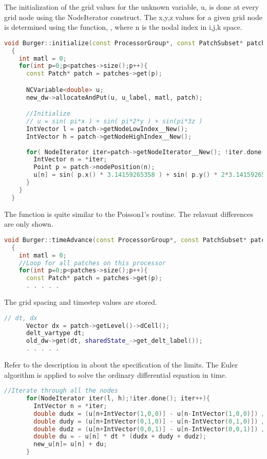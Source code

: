 The initialization of the grid values for the unknown variable, u, is
done at every grid node using the NodeIterator construct.  The x,y,z
values for a given grid node is determined using the function,
, where n is the nodal index in
i,j,k space.

\begin{lstlisting}[language=Cpp]
  void Burger::initialize(const ProcessorGroup*, const PatchSubset* patches, const MaterialSubset* matls, DataWarehouse*, DataWarehouse* new_dw)
  {
    int matl = 0;
    for(int p=0;p<patches->size();p++){
      const Patch* patch = patches->get(p);

      NCVariable<double> u;
      new_dw->allocateAndPut(u, u_label, matl, patch);

      //Initialize
      // u = sin( pi*x ) + sin( pi*2*y ) + sin(pi*3z )
      IntVector l = patch->getNodeLowIndex__New();
      IntVector h = patch->getNodeHighIndex__New();
      
      for( NodeIterator iter=patch->getNodeIterator__New(); !iter.done(); iter++ ){
        IntVector n = *iter;
        Point p = patch->nodePosition(n);
        u[n] = sin( p.x() * 3.14159265358 ) + sin( p.y() * 2*3.14159265358)  +  sin( p.z() * 3*3.14159265358);
      }
    }
  }
\end{lstlisting}

The  function is quite similar to the Poisson1's
 routine.  The relavant differences are only
shown.
\begin{lstlisting}[language=Cpp]
  void Burger::timeAdvance(const ProcessorGroup*, const PatchSubset* patches, const MaterialSubset* matls, DataWarehouse* old_dw, DataWarehouse* new_dw)
  {
    int matl = 0;
    //Loop for all patches on this processor
    for(int p=0;p<patches->size();p++){
      const Patch* patch = patches->get(p);
      . . . . .
\end{lstlisting}

    The grid spacing and timestep values are stored.
\begin{lstlisting}[language=Cpp]
      // dt, dx
      Vector dx = patch->getLevel()->dCell();
      delt_vartype dt;
      old_dw->get(dt, sharedState_->get_delt_label());
      . . . . .  
\end{lstlisting}

    Refer to the description in  about the specification
    of the  limits.  The Euler algorithm is applied to solve
    the ordinary differential equation in time.
\begin{lstlisting}[language=Cpp]
      //Iterate through all the nodes
      for(NodeIterator iter(l, h);!iter.done(); iter++){    
        IntVector n = *iter;
        double dudx = (u[n+IntVector(1,0,0)] - u[n-IntVector(1,0,0)]) /(2.0 * dx.x());
        double dudy = (u[n+IntVector(0,1,0)] - u[n-IntVector(0,1,0)]) /(2.0 * dx.y());
        double dudz = (u[n+IntVector(0,0,1)] - u[n-IntVector(0,0,1)]) /(2.0 * dx.z());
        double du = - u[n] * dt * (dudx + dudy + dudz);
        new_u[n]= u[n] + du;
      }
\end{lstlisting}

